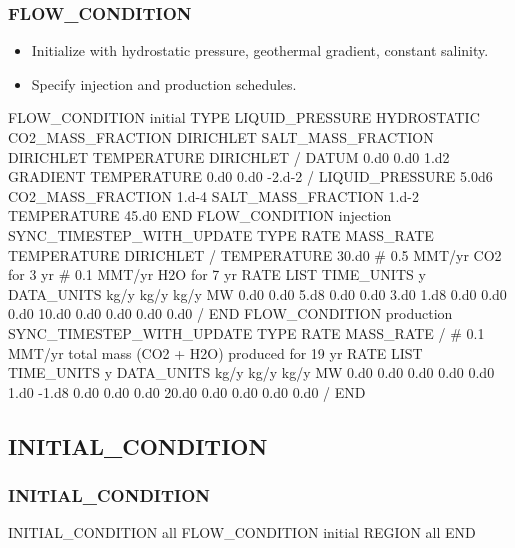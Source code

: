 \documentclass{beamer}
\begin{document}
\begin{frame}\frametitle{FLOW\_CONDITION}

\begin{itemize}
\item Initialize with hydrostatic pressure, geothermal gradient, constant salinity.
\item Specify injection and production schedules.
\end{itemize}

\newpage
\begin{semiverbatim}
FLOW_CONDITION initial
  TYPE
    LIQUID_PRESSURE HYDROSTATIC
    CO2_MASS_FRACTION DIRICHLET
    SALT_MASS_FRACTION DIRICHLET
    TEMPERATURE DIRICHLET
  /
  DATUM 0.d0 0.d0 1.d2
  GRADIENT
    TEMPERATURE 0.d0 0.d0 -2.d-2
  /
  LIQUID_PRESSURE 5.0d6
  CO2_MASS_FRACTION 1.d-4
  SALT_MASS_FRACTION 1.d-2
  TEMPERATURE 45.d0
END 
\newpage FLOW_CONDITION injection
  SYNC_TIMESTEP_WITH_UPDATE
  TYPE
    RATE MASS_RATE
    TEMPERATURE DIRICHLET
  /
  TEMPERATURE 30.d0
  # 0.5 MMT/yr CO2 for 3 yr
  # 0.1 MMT/yr H2O for 7 yr
  RATE LIST
    TIME_UNITS y
    DATA_UNITS kg/y kg/y kg/y MW
    0.d0  0.d0 5.d8 0.d0 0.d0
    3.d0 1.d8 0.d0 0.d0 0.d0
    10.d0 0.d0 0.d0 0.d0 0.d0
  /
END 
\newpage
FLOW_CONDITION production
  SYNC_TIMESTEP_WITH_UPDATE
  TYPE
    RATE MASS_RATE
  /
  # 0.1 MMT/yr total mass (CO2 + H2O) produced for 19 yr
  RATE LIST
    TIME_UNITS y
    DATA_UNITS kg/y kg/y kg/y MW
    0.d0   0.d0 0.d0 0.d0 0.d0
    1.d0  -1.d8 0.d0 0.d0 0.d0
    20.d0  0.d0 0.d0 0.d0 0.d0
  /
END
\end{semiverbatim}

\end{frame}

\subsection{INITIAL\_CONDITION}

\begin{frame}[fragile]\frametitle{INITIAL\_CONDITION}

\begin{semiverbatim}
INITIAL_CONDITION all
  FLOW_CONDITION initial
  REGION all
END

\end{semiverbatim}

\end{frame}

\end{document}
